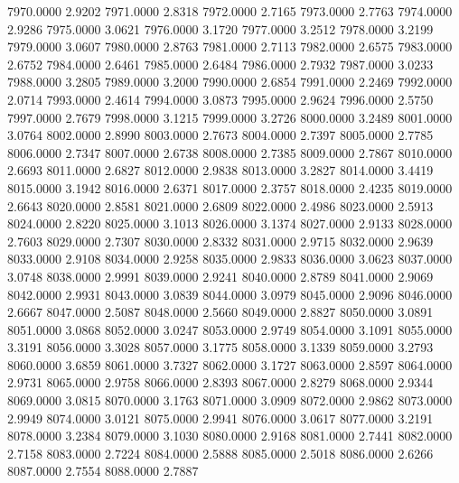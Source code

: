 7970.0000      2.9202
7971.0000      2.8318
7972.0000      2.7165
7973.0000      2.7763
7974.0000      2.9286
7975.0000      3.0621
7976.0000      3.1720
7977.0000      3.2512
7978.0000      3.2199
7979.0000      3.0607
7980.0000      2.8763
7981.0000      2.7113
7982.0000      2.6575
7983.0000      2.6752
7984.0000      2.6461
7985.0000      2.6484
7986.0000      2.7932
7987.0000      3.0233
7988.0000      3.2805
7989.0000      3.2000
7990.0000      2.6854
7991.0000      2.2469
7992.0000      2.0714
7993.0000      2.4614
7994.0000      3.0873
7995.0000      2.9624
7996.0000      2.5750
7997.0000      2.7679
7998.0000      3.1215
7999.0000      3.2726
8000.0000      3.2489
8001.0000      3.0764
8002.0000      2.8990
8003.0000      2.7673
8004.0000      2.7397
8005.0000      2.7785
8006.0000      2.7347
8007.0000      2.6738
8008.0000      2.7385
8009.0000      2.7867
8010.0000      2.6693
8011.0000      2.6827
8012.0000      2.9838
8013.0000      3.2827
8014.0000      3.4419
8015.0000      3.1942
8016.0000      2.6371
8017.0000      2.3757
8018.0000      2.4235
8019.0000      2.6643
8020.0000      2.8581
8021.0000      2.6809
8022.0000      2.4986
8023.0000      2.5913
8024.0000      2.8220
8025.0000      3.1013
8026.0000      3.1374
8027.0000      2.9133
8028.0000      2.7603
8029.0000      2.7307
8030.0000      2.8332
8031.0000      2.9715
8032.0000      2.9639
8033.0000      2.9108
8034.0000      2.9258
8035.0000      2.9833
8036.0000      3.0623
8037.0000      3.0748
8038.0000      2.9991
8039.0000      2.9241
8040.0000      2.8789
8041.0000      2.9069
8042.0000      2.9931
8043.0000      3.0839
8044.0000      3.0979
8045.0000      2.9096
8046.0000      2.6667
8047.0000      2.5087
8048.0000      2.5660
8049.0000      2.8827
8050.0000      3.0891
8051.0000      3.0868
8052.0000      3.0247
8053.0000      2.9749
8054.0000      3.1091
8055.0000      3.3191
8056.0000      3.3028
8057.0000      3.1775
8058.0000      3.1339
8059.0000      3.2793
8060.0000      3.6859
8061.0000      3.7327
8062.0000      3.1727
8063.0000      2.8597
8064.0000      2.9731
8065.0000      2.9758
8066.0000      2.8393
8067.0000      2.8279
8068.0000      2.9344
8069.0000      3.0815
8070.0000      3.1763
8071.0000      3.0909
8072.0000      2.9862
8073.0000      2.9949
8074.0000      3.0121
8075.0000      2.9941
8076.0000      3.0617
8077.0000      3.2191
8078.0000      3.2384
8079.0000      3.1030
8080.0000      2.9168
8081.0000      2.7441
8082.0000      2.7158
8083.0000      2.7224
8084.0000      2.5888
8085.0000      2.5018
8086.0000      2.6266
8087.0000      2.7554
8088.0000      2.7887
